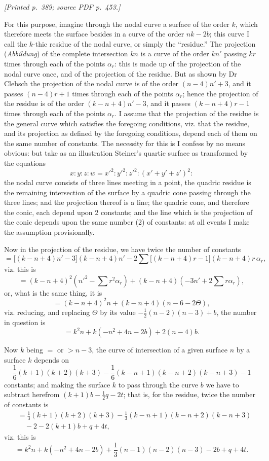 \documentclass[11pt,a4paper]{article}
\newcommand{\sourcepage}[2]{\par\smallskip\noindent\textit{[Printed p.~#1; source PDF p.~#2.]}\par\smallskip}
\begin{document}
\sourcepage{389}{453}
For this purpose, imagine through the nodal curve a surface of the order $k$, which
therefore meets the surface besides in a curve of the order $nk-2b$; this curve I call
the $k$-thic residue of the nodal curve, or simply the ``residue.'' The projection
(\textit{Abbildung}) of the complete intersection $kn$ is a curve of the order $kn'$ passing
$kr$ times through each of the points $\alpha_r$: this is made up of the projection of
the nodal curve once, and of the projection of the residue. But as shown by Dr
Clebsch the projection of the nodal curve is of the order $(n-4)n'+3$, and it passes
$(n-4)r+1$ times through each of the points $\alpha_r$; hence the projection of the
residue is of the order $(k-n+4)n'-3$, and it passes $(k-n+4)r-1$ times through each
of the points $\alpha_r$. I assume that the projection of the residue is the general
curve which satisfies the foregoing conditions, viz. that the residue, and its projection
as defined by the foregoing conditions, depend each of them on the same number of
constants. The necessity for this is I confess by no means obvious: but take as an
illustration Steiner's quartic surface as transformed by the equations
\[
x:y:z:w=x'^2:y'^2:z'^2:(x'+y'+z')^2:
\]
the nodal curve consists of three lines meeting in a point, the quadric residue is the
remaining intersection of the surface by a quadric cone passing through the three
lines; and the projection thereof is a line; the quadric cone, and therefore the conic,
each depend upon 2 constants; and the line which is the projection of the conic depends
upon the same number (2) of constants: at all events I make the assumption
provisionally.

Now in the projection of the residue, we have twice the number of constants
\[
=\bigl[(k-n+4)n'-3\bigr](k-n+4)n'
-2\sum\bigl[(k-n+4)r-1\bigr](k-n+4)r\,\alpha_r,
\]
viz. this is
\[
=(k-n+4)^2\left(n'^2-\sum r^2\alpha_r\right)
+(k-n+4)\left(-3n'+2\sum r\alpha_r\right),
\]
or, what is the same thing, it is
\[
=(k-n+4)^2n+(k-n+4)(n-6-2\Theta),
\]
viz. reducing, and replacing $\Theta$ by its value
$-\frac12(n-2)(n-3)+b$, the number in question is
\[
=k^2n+k(-n^2+4n-2b)+2(n-4)b.
\]

Now $k$ being $=$ or $>n-3$, the curve of intersection of a given surface $n$ by a
surface $k$ depends on
\[
\frac16(k+1)(k+2)(k+3)
-\frac16(k-n+1)(k-n+2)(k-n+3)-1
\]
constants; and making the surface $k$ to pass through the curve $b$ we have to subtract
herefrom $(k+1)b-\frac12q-2t$; that is, for the residue, twice the number of constants is
\[
\begin{aligned}
&=\frac13(k+1)(k+2)(k+3)
-\frac13(k-n+1)(k-n+2)(k-n+3)\\
&\quad-2-2(k+1)b+q+4t,
\end{aligned}
\]
viz. this is
\[
=k^2n+k(-n^2+4n-2b)+\frac13(n-1)(n-2)(n-3)-2b+q+4t.
\]
\end{document}
